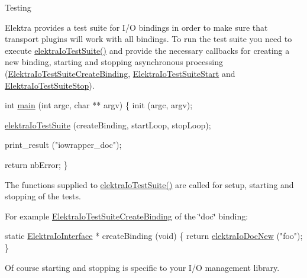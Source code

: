 \begin{DoxyParagraph}{Testing}

\end{DoxyParagraph}
Elektra provides a test suite for I/O bindings in order to make sure that transport plugins will work with all bindings. To run the test suite you need to execute \hyperlink{kdbiotest_8h_afe747efa9fd4b15b6c212ae7e1c51eb6}{elektra\+Io\+Test\+Suite()} and provide the necessary callbacks for creating a new binding, starting and stopping asynchronous processing (\hyperlink{kdbiotest_8h_a34b00a39be5b3f0a15959cda384e33dc}{Elektra\+Io\+Test\+Suite\+Create\+Binding}, \hyperlink{kdbiotest_8h_adc6ce3b9abbedf6ce56a5b0167d01286}{Elektra\+Io\+Test\+Suite\+Start} and \hyperlink{kdbiotest_8h_a0f56c00b010605d876c22d0c7a49aa0c}{Elektra\+Io\+Test\+Suite\+Stop}).


\begin{DoxyCodeInclude}
\textcolor{keywordtype}{int} \hyperlink{testio__doc_8c_a3c04138a5bfe5d72780bb7e82a18e627}{main} (\textcolor{keywordtype}{int} argc, \textcolor{keywordtype}{char} ** argv)
\{
        init (argc, argv);

        \hyperlink{kdbiotest_8h_afe747efa9fd4b15b6c212ae7e1c51eb6}{elektraIoTestSuite} (createBinding, startLoop, stopLoop);

        print\_result (\textcolor{stringliteral}{"iowrapper\_doc"});

        \textcolor{keywordflow}{return} nbError;
\}
\end{DoxyCodeInclude}
 The functions supplied to \hyperlink{kdbiotest_8h_afe747efa9fd4b15b6c212ae7e1c51eb6}{elektra\+Io\+Test\+Suite()} are called for setup, starting and stopping of the tests.

For example \hyperlink{kdbiotest_8h_a34b00a39be5b3f0a15959cda384e33dc}{Elektra\+Io\+Test\+Suite\+Create\+Binding} of the \char`\"{}doc\char`\"{} binding\+:


\begin{DoxyCodeInclude}
\textcolor{keyword}{static} \hyperlink{kdbio_8h_aabcd87b8c09d4d4c1033fc1baa417391}{ElektraIoInterface} * createBinding (\textcolor{keywordtype}{void})
\{
        \textcolor{keywordflow}{return} \hyperlink{io__doc_8c_af4bd586146acfbb1c1324483b79f0cc3}{elektraIoDocNew} (\textcolor{stringliteral}{"foo"});
\}
\end{DoxyCodeInclude}
 Of course starting and stopping is specific to your I/O management library. 